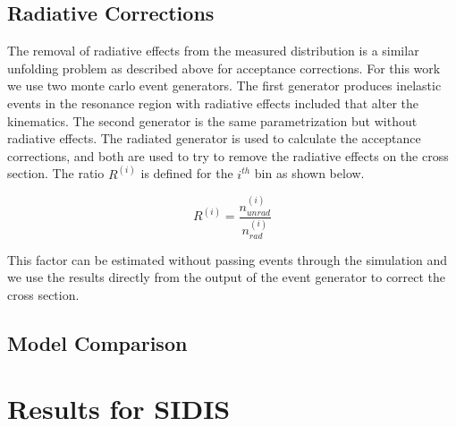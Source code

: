 \subsection{Radiative Corrections}
The removal of radiative effects from the measured distribution is a similar unfolding problem as described above for acceptance corrections.  For this work we use two monte carlo event generators.  The first generator produces inelastic events in the resonance region with radiative effects included that alter the kinematics.  The second generator is the same parametrization but without radiative effects.  The radiated generator is used to calculate the acceptance corrections, and both are used to try to remove the radiative effects on the cross section.  The ratio $R^{(i)}$ is defined for the $i^{th}$ bin as shown below.

\begin{equation}
  R^{(i)} = \frac{n_{unrad}^{(i)}}{n_{rad}^{(i)}}
\end{equation}

This factor can be estimated without passing events through the simulation and we use the results directly from the output of the event generator to correct the cross section.   

\subsection{Model Comparison}

\section{Results for SIDIS}

